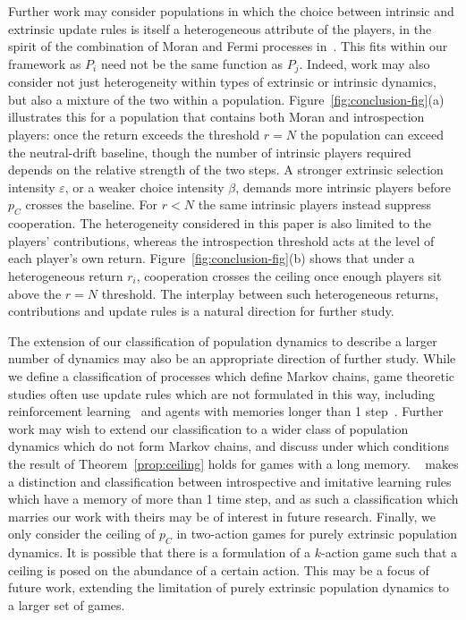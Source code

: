 \documentclass{article}
\begin{document}
Further work may consider populations in which the choice between intrinsic and
extrinsic update rules is itself a heterogeneous attribute of the players, in
the spirit of the combination of Moran and Fermi processes in~\cite{LIU2015242}.
This fits within our framework as \(P_i\) need not be the same function as
\(P_j\). Indeed, work may also consider not just heterogeneity within types of
extrinsic or intrinsic dynamics, but also a mixture of the two within a
population. Figure~\ref{fig:conclusion-fig}(a) illustrates this for a population
that contains both Moran and introspection players: once the return exceeds the
threshold \(r = N\) the population can exceed the neutral-drift baseline, though
the number of intrinsic players required depends on the relative strength of the
two steps. A stronger extrinsic selection intensity \(\varepsilon\), or a weaker
choice intensity \(\beta\), demands more intrinsic players before \(p_C\)
crosses the baseline. For \(r < N\) the same intrinsic players instead suppress
cooperation. The heterogeneity considered in this paper is also limited to the
players' contributions, whereas the introspection threshold acts at the level of
each player's own return. Figure~\ref{fig:conclusion-fig}(b) shows that under a
heterogeneous return \(r_i\), cooperation crosses the ceiling once enough
players sit above the \(r = N\) threshold. The interplay between such
heterogeneous returns, contributions and update rules is a natural direction for
further study. 

The extension of our classification of population dynamics to describe a larger
number of dynamics may also be an appropriate direction of further study. While
we define a classification of processes which define Markov chains, game
theoretic studies often use update rules which are not formulated in this way,
including reinforcement learning~\cite{an_cooperation_2025} and agents with
memories longer than 1 step~\cite{bergin_comparative_2004, PhysRevE.74.056113}.
Further work may wish to extend our classification to a wider class of
population dynamics which do not form Markov chains, and discuss under which
conditions the result of Theorem~\ref{prop:ceiling} holds for games with a long
memory. ~\cite{bergin_comparative_2004} makes a distinction and classification
between introspective and imitative learning rules which have a memory of more
than 1 time step, and as such a classification which marries our work with
theirs may be of interest in future research. Finally, we only consider the
ceiling of \(p_C\) in two-action games for purely extrinsic population dynamics.
It is possible that there is a formulation of a \(k\)-action game such that a
ceiling is posed on the abundance of a certain action. This may be a focus of
future work, extending the limitation of purely extrinsic population dynamics to
a larger set of games.
\end{document}
